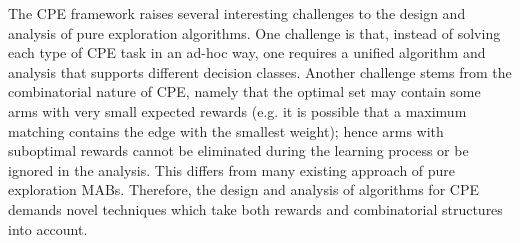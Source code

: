 \documentclass{article}
\newcommand{\junk}[1]{}
\newcommand{\Problem}{{CPE}\xspace}
\begin{document}
The \Problem framework raises several interesting challenges to the design and analysis of pure exploration algorithms. 
One challenge is that, instead of solving each type of \Problem task in an ad-hoc way, one requires a unified algorithm and analysis that supports different decision classes.
Another challenge stems from the combinatorial nature of \Problem, namely that the optimal set may contain some arms with very small expected rewards (e.g. it is possible that a maximum matching contains the edge with the smallest weight); hence arms with suboptimal rewards cannot be eliminated  during the learning process or be ignored in the analysis. This differs from many existing approach of pure exploration MABs.
Therefore, the design and analysis of algorithms for \Problem demands novel techniques which take both rewards and combinatorial structures into account.
\junk{
Before describing our results, we recall two common settings in pure exploration problems: fixed confidence and fixed budget. 
In the fixed confidence setting, the learner need to guarantee that she correctly identifies the optimal set with high probability while uses a small number of rounds(samples).  
In the fixed budget setting, the learner uses at most a fixed number of samples and she need to minimize her probability of error (identifies a suboptimal set).
}
\end{document}
